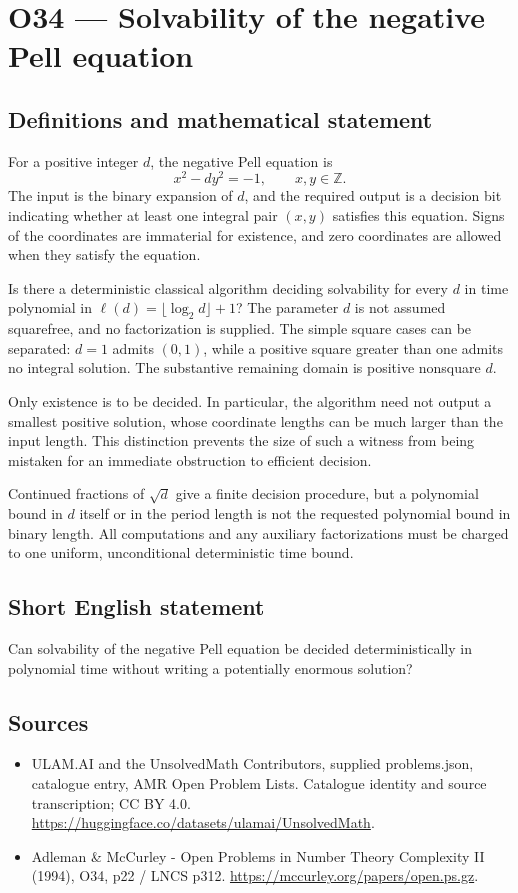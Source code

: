 \documentclass[11pt,a4paper]{article}
\begin{document}
\section*{O34 — Solvability of the negative Pell equation}\label{statement}

\subsection{Definitions and mathematical statement}
For a positive integer $d$, the negative Pell equation is
\[
x^2-dy^2=-1,\qquad x,y\in\mathbb Z.
\]
The input is the binary expansion of $d$, and the required output is a decision bit indicating whether at least one integral pair $(x,y)$ satisfies this equation. Signs of the coordinates are immaterial for existence, and zero coordinates are allowed when they satisfy the equation.

Is there a deterministic classical algorithm deciding solvability for every $d$ in time polynomial in $\ell(d)=\lfloor\log_2d\rfloor+1$? The parameter $d$ is not assumed squarefree, and no factorization is supplied. The simple square cases can be separated: $d=1$ admits $(0,1)$, while a positive square greater than one admits no integral solution. The substantive remaining domain is positive nonsquare $d$.

Only existence is to be decided. In particular, the algorithm need not output a smallest positive solution, whose coordinate lengths can be much larger than the input length. This distinction prevents the size of such a witness from being mistaken for an immediate obstruction to efficient decision.

Continued fractions of $\sqrt d$ give a finite decision procedure, but a polynomial bound in $d$ itself or in the period length is not the requested polynomial bound in binary length. All computations and any auxiliary factorizations must be charged to one uniform, unconditional deterministic time bound.
\subsection{Short English statement}
Can solvability of the negative Pell equation be decided deterministically in polynomial time without writing a potentially enormous solution?
\subsection{Sources}
\begin{itemize}
\item[S1] ULAM.AI and the UnsolvedMath Contributors, supplied problems.json, catalogue entry, AMR Open Problem Lists. Catalogue identity and source transcription; CC BY 4.0.
\url{https://huggingface.co/datasets/ulamai/UnsolvedMath}.
\item[S2] Adleman \& McCurley - Open Problems in Number Theory Complexity II (1994), O34, p22 / LNCS p312. 
\url{https://mccurley.org/papers/open.ps.gz}.
\end{itemize}
\end{document}
